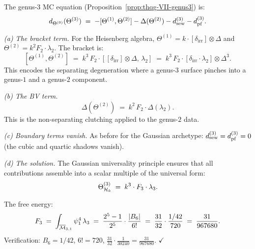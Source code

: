 \begin{computation}
\label{comp:thqg-VII-heis-g3}
The genus-$3$ MC equation
(Proposition~\ref{prop:thqg-VII-genus3}) is:
\begin{equation}\label{eq:thqg-VII-heis-mc-g3}
d_{\Theta^{(0)}}(\Theta^{(3)})
\;=\;
-[\Theta^{(1)},\Theta^{(2)}]
- \Delta(\Theta^{(2)})
- d_{\mathrm{sew}}^{(3)}
- d_{\mathrm{pf}}^{(3)}.
\end{equation}

\medskip\noindent\emph{(a) The bracket term.}
For the Heisenberg algebra, $\Theta^{(1)} = k \cdot
[\delta_{\mathrm{irr}}] \otimes \Delta$ and
$\Theta^{(2)} = k^2 F_2 \cdot \lambda_2$. The bracket is:
\begin{equation}\label{eq:thqg-VII-heis-bracket-g3}
[\Theta^{(1)},\Theta^{(2)}]
\;=\;
k^3 \, F_2 \cdot
[[\delta_{\mathrm{irr}}] \otimes \Delta,\, \lambda_2]
\;=\;
k^3 \, F_2 \cdot [\delta_{\mathrm{irr}} \cdot \lambda_2]
\otimes \Delta^3.
\end{equation}
This encodes the separating degeneration where a genus-$3$
surface pinches into a genus-$1$ and a genus-$2$ component.

\medskip\noindent\emph{(b) The BV term.}
\begin{equation}\label{eq:thqg-VII-heis-bv-g2}
\Delta(\Theta^{(2)})
\;=\;
k^2 \, F_2 \cdot \Delta(\lambda_2).
\end{equation}
This is the non-separating clutching applied to the genus-$2$
data.

\medskip\noindent\emph{(c) Boundary terms vanish.}
As before for the Gaussian archetype:
$d_{\mathrm{sew}}^{(3)} = d_{\mathrm{pf}}^{(3)} = 0$ (the cubic and quartic
shadows vanish).

\medskip\noindent\emph{(d) The solution.}
The Gaussian universality principle ensures that all
contributions assemble into a scalar multiple of the universal
form:
\begin{equation}\label{eq:thqg-VII-heis-theta3}
\Theta^{(3)}_{\mathcal{H}_k}
\;=\;
k^3 \cdot F_3 \cdot \lambda_3.
\end{equation}

The free energy:
\begin{equation}\label{eq:thqg-VII-heis-F3}
F_3
\;=\;
\int_{\overline{\mathcal{M}}_{3,1}} \psi_1^{4}\,\lambda_3
\;=\;
\frac{2^5 - 1}{2^5} \cdot \frac{|B_6|}{6!}
\;=\;
\frac{31}{32} \cdot \frac{1/42}{720}
\;=\;
\frac{31}{967680}.
\end{equation}
Verification: $B_6 = 1/42$, $6! = 720$,
$\frac{31}{32} \cdot \frac{1}{30240} = \frac{31}{967680}$. $\checkmark$
\end{computation}

